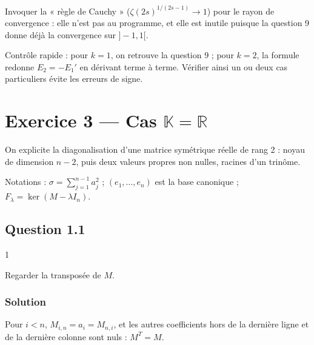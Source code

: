 \documentclass[11pt,a4paper]{article}
\begin{document}
\begin{piege}

Invoquer la « règle de Cauchy » (\(\zeta(2s)^{1/(2s-1)}\to1\)) pour le rayon de convergence : elle n'est pas au programme, et elle est inutile puisque la question 9 donne déjà la convergence sur \(]-1,1[\).

\end{piege}

\begin{methode}

Contrôle rapide : pour \(k=1\), on retrouve la question 9 ; pour \(k=2\), la formule redonne \(E_2=-E_1'\) en dérivant terme à terme. Vérifier ainsi un ou deux cas particuliers évite les erreurs de signe.

\end{methode}

\hypertarget{exercice-3-cas-mathbb-kmathbb-r}{%
\section{\texorpdfstring{Exercice 3 --- Cas \(\mathbb K=\mathbb R\)}{Exercice 3 --- Cas \textbackslash mathbb K=\textbackslash mathbb R}}\label{exercice-3-cas-mathbb-kmathbb-r}}

On explicite la diagonalisation d'une matrice symétrique réelle de rang 2 : noyau de dimension \(n-2\), puis deux valeurs propres non nulles, racines d'un trinôme.

Notations : \(\sigma=\sum_{j=1}^{n-1}a_j^2\) ; \((e_1,\dots,e_n)\) est la base canonique ; \(F_\lambda=\ker(M-\lambda I_n)\).

\hypertarget{question-1.1}{%
\subsection{Question 1.1}\label{question-1.1}}

\begin{indication}{1}

Regarder la transposée de \(M\).

\end{indication}

\hypertarget{solution-30}{%
\subsubsection{Solution}\label{solution-30}}

Pour \(i<n\), \(M_{i,n}=a_i=M_{n,i}\), et les autres coefficients hors de la dernière ligne et de la dernière colonne sont nuls : \(M^T=M\).
\end{document}

